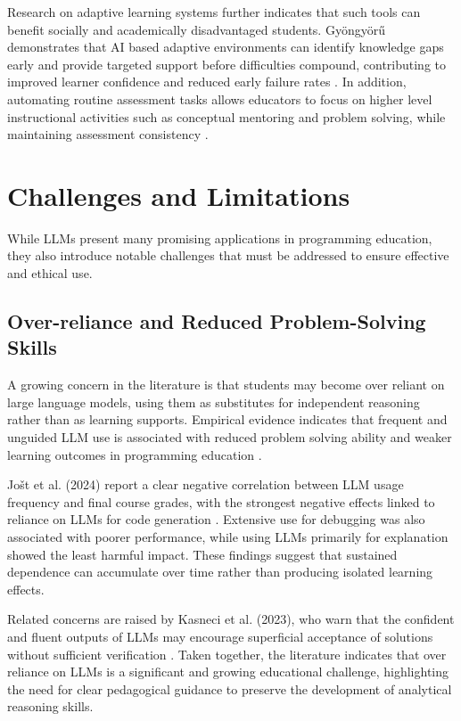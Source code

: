 \documentclass[10pt,journal,compsoc]{IEEEtran}
\begin{document}
Research on adaptive learning systems further indicates that such tools can benefit socially and academically disadvantaged students. Gyöngyörű demonstrates that AI based adaptive environments can identify knowledge gaps early and provide targeted support before difficulties compound, contributing to improved learner confidence and reduced early failure rates \cite{katona_ai-based_2025}. In addition, automating routine assessment tasks allows educators to focus on higher level instructional activities such as conceptual mentoring and problem solving, while maintaining assessment consistency \cite{Kasneci2023}.

\section{Challenges and Limitations}
\label{sec:challenges}
While LLMs present many promising applications in programming education, they also introduce notable challenges that must be addressed to ensure effective and ethical use.

\subsection{Over-reliance and Reduced Problem-Solving Skills}
A growing concern in the literature is that students may become over reliant on large language models, using them as substitutes for independent reasoning rather than as learning supports. Empirical evidence indicates that frequent and unguided LLM use is associated with reduced problem solving ability and weaker learning outcomes in programming education \cite{10.1145/3639474.3640076}.

Jošt et al. (2024) report a clear negative correlation between LLM usage frequency and final course grades, with the strongest negative effects linked to reliance on LLMs for code generation \cite{app14104115}. Extensive use for debugging was also associated with poorer performance, while using LLMs primarily for explanation showed the least harmful impact. These findings suggest that sustained dependence can accumulate over time rather than producing isolated learning effects.

Related concerns are raised by Kasneci et al. (2023), who warn that the confident and fluent outputs of LLMs may encourage superficial acceptance of solutions without sufficient verification \cite{Kasneci2023}. Taken together, the literature indicates that over reliance on LLMs is a significant and growing educational challenge, highlighting the need for clear pedagogical guidance to preserve the development of analytical reasoning skills.
\end{document}
